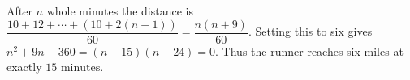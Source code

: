 After $n$ whole minutes the distance is $\dfrac{10+12+\cdots+(10+2(n-1))}{60}=\dfrac{n(n+9)}{60}$. Setting this to six gives $n^2+9n-360=(n-15)(n+24)=0$. Thus the runner reaches six miles at exactly $\boxed{15\text{ minutes}}$.
